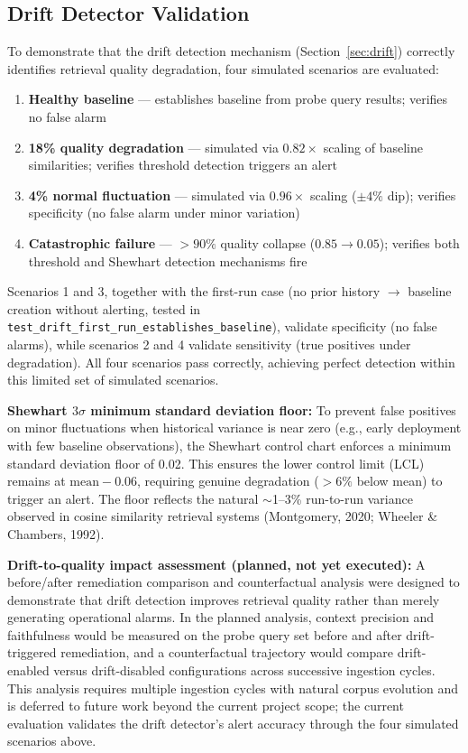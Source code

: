 \subsection{Drift Detector Validation}
\label{sec:drift_validation}

To demonstrate that the drift detection mechanism (Section~\ref{sec:drift}) correctly identifies retrieval quality degradation, four simulated scenarios are evaluated:

\begin{enumerate}[leftmargin=0.5in]
  \item \textbf{Healthy baseline} --- establishes baseline from probe query results; verifies no false alarm
  \item \textbf{18\% quality degradation} --- simulated via $0.82\times$ scaling of baseline similarities; verifies threshold detection triggers an alert
  \item \textbf{4\% normal fluctuation} --- simulated via $0.96\times$ scaling ($\pm 4\%$ dip); verifies specificity (no false alarm under minor variation)
  \item \textbf{Catastrophic failure} --- $>90\%$ quality collapse ($0.85 \to 0.05$); verifies both threshold and Shewhart detection mechanisms fire
\end{enumerate}

\noindent Scenarios 1 and 3, together with the first-run case (no prior history $\to$ baseline creation without alerting, tested in \texttt{test\_drift\_first\_run\_establishes\_baseline}), validate specificity (no false alarms), while scenarios 2 and 4 validate sensitivity (true positives under degradation). All four scenarios pass correctly, achieving perfect detection within this limited set of simulated scenarios.

\textbf{Shewhart $3\sigma$ minimum standard deviation floor:} To prevent false positives on minor fluctuations when historical variance is near zero (e.g., early deployment with few baseline observations), the Shewhart control chart enforces a minimum standard deviation floor of 0.02. This ensures the lower control limit (LCL) remains at $\text{mean} - 0.06$, requiring genuine degradation ($>6\%$ below mean) to trigger an alert. The floor reflects the natural $\sim$1--3\% run-to-run variance observed in cosine similarity retrieval systems (Montgomery, 2020; Wheeler \& Chambers, 1992).

\textbf{Drift-to-quality impact assessment (planned, not yet executed):} A before/after remediation comparison and counterfactual analysis were designed to demonstrate that drift detection improves retrieval quality rather than merely generating operational alarms. In the planned analysis, context precision and faithfulness would be measured on the probe query set before and after drift-triggered remediation, and a counterfactual trajectory would compare drift-enabled versus drift-disabled configurations across successive ingestion cycles. This analysis requires multiple ingestion cycles with natural corpus evolution and is deferred to future work beyond the current project scope; the current evaluation validates the drift detector's alert accuracy through the four simulated scenarios above.

